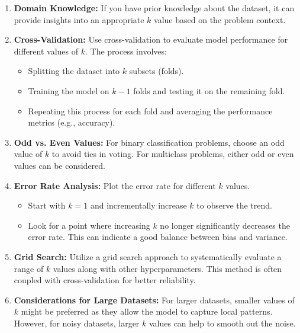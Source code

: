 \begin{enumerate}
    \item \textbf{Domain Knowledge:} If you have prior knowledge about the dataset, it can provide insights into an appropriate \( k \) value based on the problem context.

    \item \textbf{Cross-Validation:} Use cross-validation to evaluate model performance for different values of \( k \). The process involves:
    \begin{itemize}
        \item Splitting the dataset into \( k \) subsets (folds).
        \item Training the model on \( k-1 \) folds and testing it on the remaining fold.
        \item Repeating this process for each fold and averaging the performance metrics (e.g., accuracy).
    \end{itemize}

    \item \textbf{Odd vs. Even Values:} For binary classification problems, choose an odd value of \( k \) to avoid ties in voting. For multiclass problems, either odd or even values can be considered.

    \item \textbf{Error Rate Analysis:} Plot the error rate for different \( k \) values. 
    \begin{itemize}
        \item Start with \( k = 1 \) and incrementally increase \( k \) to observe the trend.
        \item Look for a point where increasing \( k \) no longer significantly decreases the error rate. This can indicate a good balance between bias and variance.
    \end{itemize}

    \item \textbf{Grid Search:} Utilize a grid search approach to systematically evaluate a range of \( k \) values along with other hyperparameters. This method is often coupled with cross-validation for better reliability.

    \item \textbf{Considerations for Large Datasets:} For larger datasets, smaller values of \( k \) might be preferred as they allow the model to capture local patterns. However, for noisy datasets, larger \( k \) values can help to smooth out the noise.
\end{enumerate}

